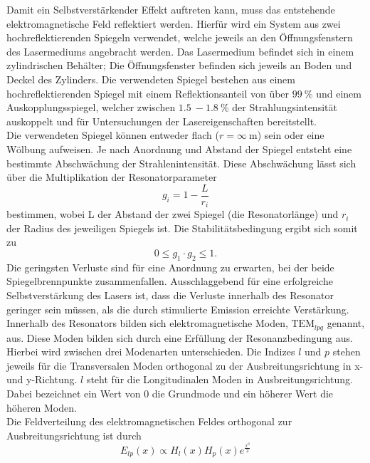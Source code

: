 Damit ein Selbstverstärkender Effekt auftreten kann, muss das entstehende elektromagnetische Feld reflektiert werden. Hierfür wird ein System aus zwei
hochreflektierenden Spiegeln verwendet, welche jeweils an den Öffnungsfenstern des Lasermediums angebracht werden. Das Lasermedium befindet sich in einem 
zylindrischen Behälter; Die Öffnungsfenster befinden sich jeweils an Boden und Deckel des Zylinders. Die verwendeten Spiegel bestehen aus einem hochreflektierenden
Spiegel mit einem Reflektionsanteil von über $\qty{99}{\%}$ und einem Auskopplungsspiegel, welcher zwischen $\qty{1.5}{}-\qty{1.8}{\%}$ der Strahlungsintensität
auskoppelt und für Untersuchungen der Lasereigenschaften bereitstellt.\\
Die verwendeten Spiegel können entweder flach ($r = \infty\qty{}{\metre}$) sein oder eine Wölbung aufweisen. Je nach Anordnung und Abstand der Spiegel entsteht
eine bestimmte Abschwächung der Strahlenintensität. Diese Abschwächung lässt sich über die Multiplikation der Resonatorparameter
\begin{equation}
    g_i = 1 - \frac{L}{r_i}
\end{equation}
bestimmen, wobei L der Abstand der zwei Spiegel (die Resonatorlänge) und $r_i$ der Radius des jeweiligen Spiegels ist. Die Stabilitätsbedingung ergibt sich somit zu 
\begin{equation}
    0 \leq g_1 \cdot g_2 \leq 1.
\end{equation}
Die geringsten Verluste sind für eine Anordnung zu erwarten, bei der beide Spiegelbrennpunkte zusammenfallen. Ausschlaggebend für eine erfolgreiche Selbstverstärkung
des Lasers ist, dass die Verluste innerhalb des Resonator geringer sein müssen, als die durch stimulierte Emission erreichte Verstärkung.\\
Innerhalb des Resonators bilden sich elektromagnetische Moden, $\mathrm{TEM}_{lpq}$ genannt, aus. Diese Moden bilden sich durch eine Erfüllung der Resonanzbedingung aus.
Hierbei wird zwischen drei Modenarten unterschieden. Die Indizes $l$ und $p$ stehen jeweils für die Transversalen Moden orthogonal zu der Ausbreitungsrichtung in x-
und y-Richtung. $l$ steht für die Longitudinalen Moden in Ausbreitungsrichtung. Dabei bezeichnet ein Wert von $0$ die Grundmode und ein höherer Wert die höheren Moden.\\
Die Feldverteilung des elektromagnetischen Feldes orthogonal zur Ausbreitungsrichtung ist durch
\begin{equation}
    E_{lp}(x) \propto H_l(x) H_p(x) e^{\frac{x^2}{2}}
\end{equation}
